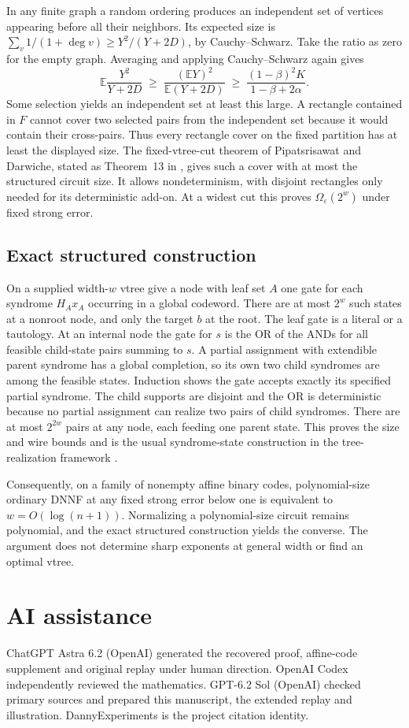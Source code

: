 \documentclass[11pt,a4paper]{amsart}
\newcommand{\E}{\mathbb E}
\begin{document}
In any finite graph a random ordering produces an independent set of vertices appearing before all their neighbors. Its expected size is $\sum_v1/(1+\deg v)\geq Y^2/(Y+2D)$, by Cauchy--Schwarz. Take the ratio as zero for the empty graph. Averaging and applying Cauchy--Schwarz again gives
\[
  \E\frac{Y^2}{Y+2D}\;\geq\;\frac{(\E Y)^2}{\E(Y+2D)}\;\geq\;
                     \frac{(1-\beta)^2 K}{1-\beta+2\alpha}.
\]
Some selection yields an independent set at least this large. A rectangle contained in $F$ cannot cover two selected pairs from the independent set because it would contain their cross-pairs. Thus every rectangle cover on the fixed partition has at least the displayed size. The fixed-vtree-cut theorem of Pipatsrisawat and Darwiche, stated as Theorem~13 in \cite{rectangles}, gives such a cover with at most the structured circuit size. It allows nondeterminism, with disjoint rectangles only needed for its deterministic add-on. At a widest cut this proves $\Omega_{\varepsilon}(2^w)$ under fixed strong error.

\subsection{Exact structured construction}
On a supplied width-$w$ vtree give a node with leaf set $A$ one gate for each syndrome $H_Ax_A$ occurring in a global codeword. There are at most $2^w$ such states at a nonroot node, and only the target $b$ at the root. The leaf gate is a literal or a tautology. At an internal node the gate for $s$ is the OR of the ANDs for all feasible child-state pairs summing to $s$. A partial assignment with extendible parent syndrome has a global completion, so its own two child syndromes are among the feasible states. Induction shows the gate accepts exactly its specified partial syndrome. The child supports are disjoint and the OR is deterministic because no partial assignment can realize two pairs of child syndromes. There are at most $2^{2w}$ pairs at any node, each feeding one parent state. This proves the size and wire bounds and is the usual syndrome-state construction in the tree-realization framework \cite{kashyap}.

Consequently, on a family of nonempty affine binary codes, polynomial-size ordinary DNNF at any fixed strong error below one is equivalent to $w=O(\log(n+1))$. Normalizing a polynomial-size circuit remains polynomial, and the exact structured construction yields the converse. The argument does not determine sharp exponents at general width or find an optimal vtree.

\section*{AI assistance}
ChatGPT Astra 6.2 (OpenAI) generated the recovered proof, affine-code supplement and original replay under human direction. OpenAI Codex independently reviewed the mathematics. GPT-6.2 Sol (OpenAI) checked primary sources and prepared this manuscript, the extended replay and illustration. DannyExperiments is the project citation identity.



\end{document}
